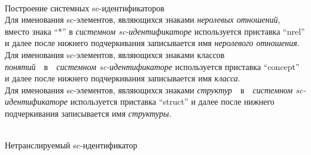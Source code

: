 \begin{frame}{\\Построение системных sc-идентификаторов}
	\topline
	\justifying
	\vspace*{\fill}\\
	 Для именования sc-элементов, являющихся знаками \textit{неролевых отношений}, вместо знака ``*'' в \textit{системном sc-идентификаторе} используется приставка ``nrel'' и далее после нижнего подчеркивания записывается имя \textit{неролевого отношения}.\\

	\bigskip	
	Для именования sc-элементов, являющихся знаками классов \textit{понятий}~~в~~\textit{системном sc-идентификаторе} используется приставка ``concept'' и далее после нижнего подчеркивания записывается имя \textit{класса}.\\

	\bigskip
	Для именования sc-элементов, являющихся знаками \textit{структур}~~в~~\textit{системном sc-идентификаторе} используется приставка ``struct'' и далее после нижнего подчеркивания записывается имя \textit{структуры}.
\end{frame}

\begin{frame}{\\Нетранслируемый sc-идентификатор}
	\topline
	\justifying
\begin{SCn}
\end{SCn}
	
\end{frame}

